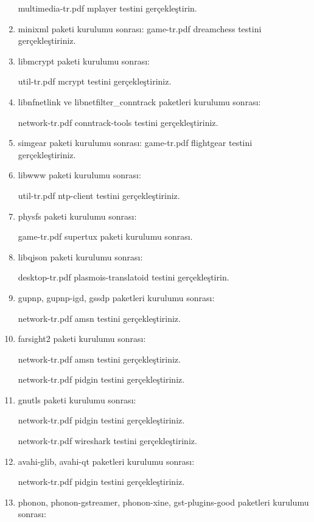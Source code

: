 \documentclass[a4paper,10pt]{article}
\begin{document}
\begin{enumerate}
multimedia-tr.pdf mplayer testini gerçekleştirin.

\item minixml paketi kurulumu sonrası:
game-tr.pdf dreamchess testini gerçekleştiriniz.

\item libmcrypt paketi kurulumu sonrası:

util-tr.pdf mcrypt testini gerçekleştiriniz.

\item libnfnetlink ve libnetfilter\_conntrack paketleri kurulumu sonrası:

network-tr.pdf conntrack-tools testini gerçekleştiriniz.

\item simgear paketi kurulumu sonrası:
game-tr.pdf flightgear testini gerçekleştiriniz.

\item libwww paketi kurulumu sonrası:

util-tr.pdf ntp-client testini gerçekleştiriniz.

\item physfs paketi kurulumu sonrası:

game-tr.pdf supertux paketi kurulumu sonrası.

\item libqjson paketi kurulumu sonrası:

desktop-tr.pdf plasmois-translatoid testini gerçekleştirin.

\item gupnp, gupnp-igd, gssdp paketleri kurulumu sonrası:

network-tr.pdf amsn testini gerçekleştiriniz.

\item farsight2 paketi kurulumu sonrası:

network-tr.pdf amsn testini gerçekleştiriniz.

network-tr.pdf pidgin testini gerçekleştiriniz.

\item gnutls paketi kurulumu sonrası:

network-tr.pdf pidgin testini gerçekleştiriniz.

network-tr.pdf wireshark testini gerçekleştiriniz.

\item avahi-glib, avahi-qt paketleri kurulumu sonrası:

network-tr.pdf pidgin testini gerçekleştiriniz.

\item phonon, phonon-gstreamer, phonon-xine, gst-plugins-good paketleri kurulumu sonrası:


\end{enumerate}
\end{document}
